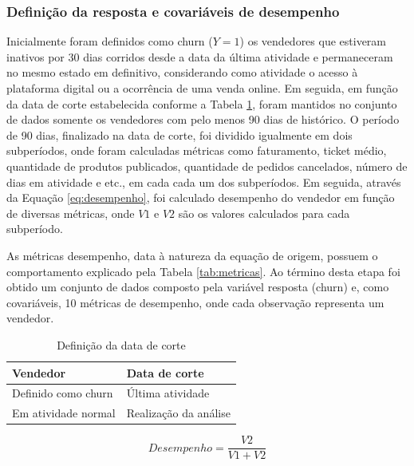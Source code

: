 \documentclass[twocolumn]{rbef}
\newcommand{\1}{\mathbbm{1}}
\begin{document}
\hypertarget{definiuxe7uxe3o-da-resposta-e-covariuxe1veis-de-desempenho}{%
\subsubsection{Definição da resposta e covariáveis de desempenho}\label{definiuxe7uxe3o-da-resposta-e-covariuxe1veis-de-desempenho}}

Inicialmente foram definidos como churn (\(Y=1\)) os vendedores que estiveram inativos por 30 dias corridos desde a data da última atividade e permaneceram no mesmo estado em definitivo, considerando como atividade o acesso à plataforma digital ou a ocorrência de uma venda online. Em seguida, em função da data de corte estabelecida conforme a Tabela \ref{tab:dataDeCorte}, foram mantidos no conjunto de dados somente os vendedores com pelo menos 90 dias de histórico. O período de 90 dias, finalizado na data de corte, foi dividido igualmente em dois subperíodos, onde foram calculadas métricas como faturamento, ticket médio, quantidade de produtos publicados, quantidade de pedidos cancelados, número de dias em atividade e etc., em cada cada um dos subperíodos. Em seguida, através da Equação \eqref{eq:desempenho}, foi calculado desempenho do vendedor em função de diversas métricas, onde \(V1\) e \(V2\) são os valores calculados para cada subperíodo.

As métricas desempenho, data à natureza da equação de origem, possuem o comportamento explicado pela Tabela \ref{tab:metricas}. Ao término desta etapa foi obtido um conjunto de dados composto pela variável resposta (churn) e, como covariáveis, 10 métricas de desempenho, onde cada observação representa um vendedor.

\begin{table}

\caption{\label{tab:dataDeCorte}Definição da data de corte}
\centering
\fontsize{9}{11}\selectfont
\begin{tabular}[t]{ll}
\toprule
Vendedor & Data de corte\\
\midrule
Definido como churn & Última atividade\\
Em atividade normal & Realização da análise\\
\bottomrule
\end{tabular}
\end{table}

\begin{equation}
Desempenho = \dfrac{V2}{V1+V2} \label{eq:desempenho}
\end{equation}
\end{document}
